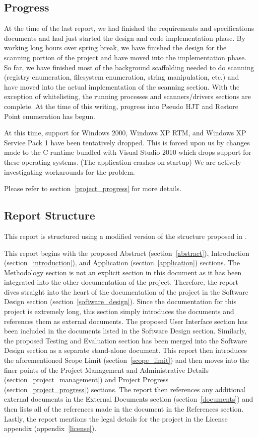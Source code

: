\documentclass[letterpaper,12pt]{article}
\begin{document}
\subsection{Progress}
At the time of the last report, we had finished the requirements and
specifications documents and had just started the design and code implementation
phase.  By working long hours over spring break, we have finished the design for
the scanning portion of the project and have moved into the implementation
phase.  So far, we have finished most of the background scaffolding needed to do
scanning (registry enumeration, filesystem enumeration, string manipulation,
etc.) and have moved into the actual implementation of the scanning section. 
With the exception of whitelisting, the running processes and scanners/drivers
sections are complete.  At the time of this writing, progress into Pseudo HJT
and Restore Point enumeration has begun.  

At this time, support for Windows 2000, Windows XP RTM, and Windows XP Service
Pack 1 have been tentatively dropped. This is forced upon us by changes made to
the C runtime bundled with Visual Studio 2010 which drops support for these
operating systems. (The application crashes on startup) We are actively
investigating workarounds for the problem.

Please refer to section~\ref{project_progress} for more details.  

\subsection{Report Structure}
This report is structured using a modified version of the structure proposed in
\cite{ReportGuidelines}.

This report begins with the proposed Abstract (section~\ref{abstract}),
Introduction (section~\ref{introduction}), and Application
(section~\ref{application}) sections.  The Methodology section is not an
explicit section in this document as it has been integrated into the other
documentation of the project.  Therefore, the report dives straight into the
heart of the documentation of the project in the Software Design section
(section~\ref{software_design}).  Since the documentation for this project is
extremely long, this section simply introduces the documents and references them
as external documents.  The proposed User Interface section has been included in
the documents listed in the Software Design section.  Similarly, the proposed
Testing and Evaluation section has been merged into the Software Design section
as a separate stand-alone document. This report then introduces the
aforementioned Scope Limit (section~\ref{scope_limit}) and then moves into the
finer points of the Project Management and Administrative Details
(section~\ref{project_management}) and Project Progress
(section~\ref{project_progress}) sections.  The report then references any
additional external documents in the External Documents section
(section~\ref{documents}) and then lists all of the references made in the
document in the References section.  Lastly, the report mentions the legal
details for the project in the License appendix (appendix~\ref{license}).
\end{document}
